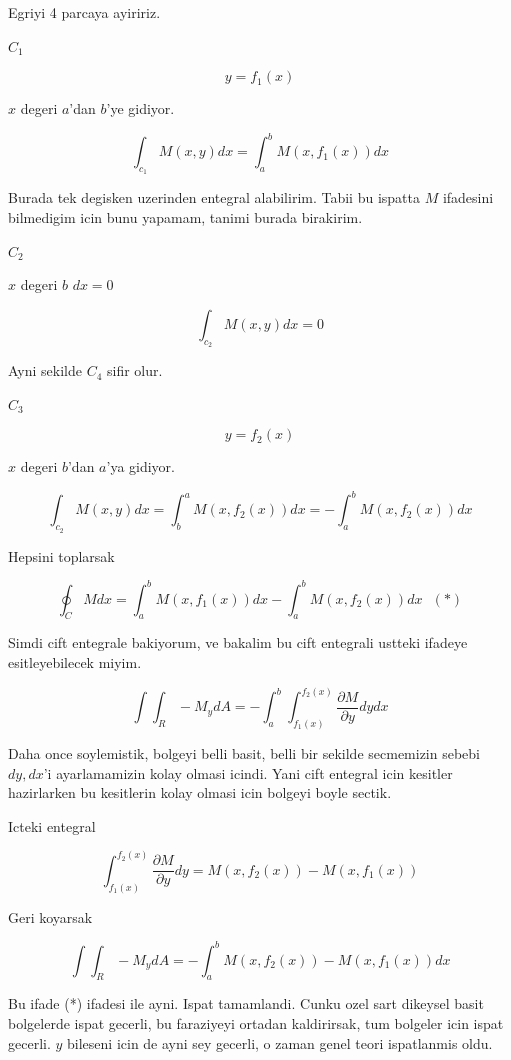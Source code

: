 \documentclass[12pt,fleqn]{article}
\begin{document}
Egriyi 4 parcaya ayiririz. 

$C_1$

\[ y = f_1(x) \]

$x$ degeri $a$'dan $b$'ye gidiyor. 

\[ \int_{c_1}M(x,y) dx = \int_a^b M(x,f_1(x))  dx\]

Burada tek degisken uzerinden entegral alabilirim. Tabii bu ispatta $M$
ifadesini bilmedigim icin bunu yapamam, tanimi burada birakirim. 

$C_2$

$x$ degeri $b$ $dx = 0$

\[ \int_{c_2}M(x,y) dx = 0\]

Ayni sekilde $C_4$ sifir olur. 

$C_3$

\[ y = f_2(x) \]

$x$ degeri $b$'dan $a$'ya gidiyor. 

\[ \int_{c_2}M(x,y) dx = \int_b^a M(x,f_2(x)) dx = 
-  \int_a^b M(x,f_2(x)) dx 
\]

Hepsini toplarsak

\[ \oint_C M dx  =
\int_a^b M(x,f_1(x))  dx -
\int_a^b M(x,f_2(x)) dx  \  \  \ (*)
 \]

Simdi cift entegrale bakiyorum, ve bakalim bu cift entegrali ustteki
ifadeye esitleyebilecek miyim. 

\[ \int \int_R -M_y dA = 
- \int_a^b \int_{f_1(x)}^{f_2(x)} \frac{\partial M}{\partial y} dy dx \]

Daha once soylemistik, bolgeyi belli basit, belli bir sekilde secmemizin
sebebi $dy,dx$'i ayarlamamizin kolay olmasi icindi. Yani cift entegral icin
kesitler hazirlarken bu kesitlerin kolay olmasi icin bolgeyi boyle
sectik. 

Icteki entegral

\[ \int_{f_1(x)}^{f_2(x)} \frac{\partial M}{\partial y} dy =
M(x,f_2(x)) - M(x,f_1(x))
 \]

Geri koyarsak

\[ \int \int_R -M_y dA = 
- \int_a^b M(x,f_2(x)) - M(x,f_1(x)) dx \]

Bu ifade (*) ifadesi ile ayni. Ispat tamamlandi. Cunku ozel sart dikeysel
basit bolgelerde ispat gecerli, bu faraziyeyi ortadan kaldirirsak, tum
bolgeler icin ispat gecerli. $y$ bileseni icin de ayni sey gecerli, o zaman
genel teori ispatlanmis oldu. 
\end{document}
